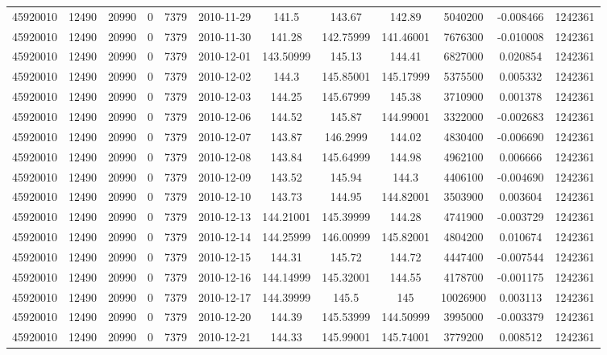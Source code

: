 \documentclass[12 pt]{article}
\begin{document}
\begin{flushleft}
\begin{table}[h]
\begin{tabular}{c c c c c c c c c c c c }
45920010 & 12490 & 20990 & 0 & 7379 & 2010-11-29 & 141.5 & 143.67 & 142.89 & 5040200 & -0.008466 & 1242361\\
45920010 & 12490 & 20990 & 0 & 7379 & 2010-11-30 & 141.28 & 142.75999 & 141.46001 & 7676300 & -0.010008 & 1242361\\
45920010 & 12490 & 20990 & 0 & 7379 & 2010-12-01 & 143.50999 & 145.13 & 144.41 & 6827000 & 0.020854 & 1242361\\
45920010 & 12490 & 20990 & 0 & 7379 & 2010-12-02 & 144.3 & 145.85001 & 145.17999 & 5375500 & 0.005332 & 1242361\\
45920010 & 12490 & 20990 & 0 & 7379 & 2010-12-03 & 144.25 & 145.67999 & 145.38 & 3710900 & 0.001378 & 1242361\\
45920010 & 12490 & 20990 & 0 & 7379 & 2010-12-06 & 144.52 & 145.87 & 144.99001 & 3322000 & -0.002683 & 1242361\\
45920010 & 12490 & 20990 & 0 & 7379 & 2010-12-07 & 143.87 & 146.2999 & 144.02 & 4830400 & -0.006690 & 1242361\\
45920010 & 12490 & 20990 & 0 & 7379 & 2010-12-08 & 143.84 & 145.64999 & 144.98 & 4962100 & 0.006666 & 1242361\\
45920010 & 12490 & 20990 & 0 & 7379 & 2010-12-09 & 143.52 & 145.94 & 144.3 & 4406100 & -0.004690 & 1242361\\
45920010 & 12490 & 20990 & 0 & 7379 & 2010-12-10 & 143.73 & 144.95 & 144.82001 & 3503900 & 0.003604 & 1242361\\
45920010 & 12490 & 20990 & 0 & 7379 & 2010-12-13 & 144.21001 & 145.39999 & 144.28 & 4741900 & -0.003729 & 1242361\\
45920010 & 12490 & 20990 & 0 & 7379 & 2010-12-14 & 144.25999 & 146.00999 & 145.82001 & 4804200 & 0.010674 & 1242361\\
45920010 & 12490 & 20990 & 0 & 7379 & 2010-12-15 & 144.31 & 145.72 & 144.72 & 4447400 & -0.007544 & 1242361\\
45920010 & 12490 & 20990 & 0 & 7379 & 2010-12-16 & 144.14999 & 145.32001 & 144.55 & 4178700 & -0.001175 & 1242361\\
45920010 & 12490 & 20990 & 0 & 7379 & 2010-12-17 & 144.39999 & 145.5 & 145 & 10026900 & 0.003113 & 1242361\\
45920010 & 12490 & 20990 & 0 & 7379 & 2010-12-20 & 144.39 & 145.53999 & 144.50999 & 3995000 & -0.003379 & 1242361\\
45920010 & 12490 & 20990 & 0 & 7379 & 2010-12-21 & 144.33 & 145.99001 & 145.74001 & 3779200 & 0.008512 & 1242361\\

\end{tabular}
\end{table}
\end{flushleft}
\end{document}
